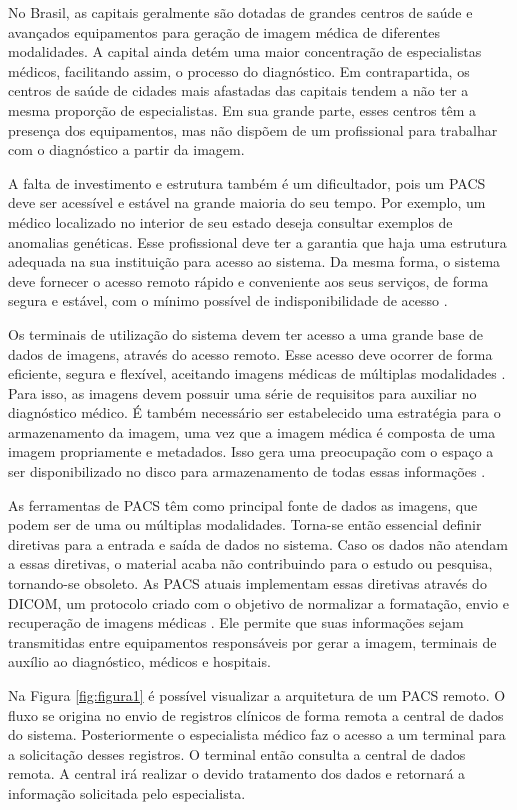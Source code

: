 No Brasil, as capitais geralmente são dotadas de grandes centros de saúde e avançados equipamentos para geração de imagem médica de diferentes modalidades.
A capital ainda detém uma maior concentração de especialistas médicos, facilitando assim, o processo do diagnóstico.
Em contrapartida, os centros de saúde de cidades mais afastadas das capitais tendem a não ter a mesma proporção de especialistas.
Em sua grande parte, esses centros têm a presença dos equipamentos, mas não dispõem de um profissional para trabalhar com o diagnóstico a partir da imagem.

A falta de investimento e estrutura também é um dificultador, pois um PACS deve ser acessível e estável na grande maioria do seu tempo.
Por exemplo, um médico localizado no interior de seu estado deseja consultar exemplos de anomalias genéticas.
Esse profissional deve ter a garantia que haja uma estrutura adequada na sua instituição para acesso ao sistema.
Da mesma forma, o sistema deve fornecer o acesso remoto rápido e conveniente aos seus serviços, de forma segura e estável, com o mínimo possível de indisponibilidade de acesso \cite{REF19}.

Os terminais de utilização do sistema devem ter acesso a uma grande base de dados de imagens, através do acesso remoto.
Esse acesso deve ocorrer de forma eficiente, segura e flexível, aceitando imagens médicas de múltiplas modalidades \cite{REF18}.
Para isso, as imagens devem possuir uma série de requisitos para auxiliar no diagnóstico médico.
É também necessário ser estabelecido uma estratégia para o armazenamento da imagem, uma vez que a imagem médica é composta de uma imagem propriamente e metadados.
Isso gera uma preocupação com o espaço a ser disponibilizado no disco para armazenamento de todas essas informações \cite{REF10}.

As ferramentas de PACS têm como principal fonte de dados as imagens, que podem ser de uma ou múltiplas modalidades.
Torna-se então essencial definir diretivas para a entrada e saída de dados no sistema.
Caso os dados não atendam a essas diretivas, o material acaba não contribuindo para o estudo ou pesquisa, tornando-se obsoleto.
As PACS atuais implementam essas diretivas através do DICOM, um protocolo criado com o objetivo de normalizar a formatação, envio e recuperação de imagens médicas \cite{REF20}.
Ele permite que suas informações sejam transmitidas entre equipamentos responsáveis por gerar a imagem, terminais de auxílio ao diagnóstico, médicos e hospitais. 

Na Figura \ref{fig:figura1} é possível visualizar a arquitetura de um PACS remoto. O fluxo se origina no envio de registros clínicos de forma remota a central de dados do sistema. Posteriormente o especialista médico faz o acesso a um terminal para a solicitação desses registros. O terminal então consulta a central de dados remota. A central irá realizar o devido tratamento dos dados e retornará a informação solicitada pelo especialista.


